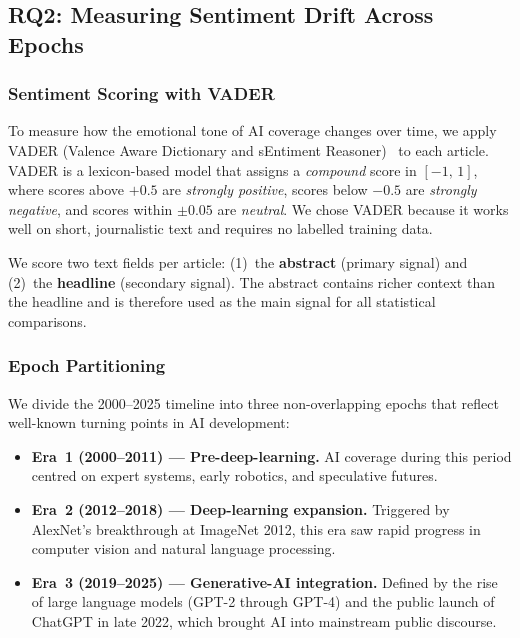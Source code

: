 
\subsection{RQ2: Measuring Sentiment Drift Across Epochs}
\label{subsec:rq2-method}

\subsubsection{Sentiment Scoring with VADER}

To measure how the emotional tone of AI coverage changes over time, we apply
VADER (Valence Aware Dictionary and sEntiment Reasoner)~\cite{hutto2014vader}
to each article. VADER is a lexicon-based model that assigns a
\textit{compound} score in $[-1,\,1]$, where scores above $+0.5$ are
\textit{strongly positive}, scores below $-0.5$ are \textit{strongly
negative}, and scores within $\pm 0.05$ are \textit{neutral}. We chose VADER
because it works well on short, journalistic text and requires no
labelled training data.

We score two text fields per article: (1)~the \textbf{abstract} (primary
signal) and (2)~the \textbf{headline} (secondary signal). The abstract
contains richer context than the headline and is therefore used as the main
signal for all statistical comparisons.

\subsubsection{Epoch Partitioning}

We divide the 2000--2025 timeline into three non-overlapping epochs that
reflect well-known turning points in AI development:

\begin{itemize}
  \item \textbf{Era~1 (2000--2011) --- Pre-deep-learning.} AI coverage
  during this period centred on expert systems, early robotics, and
  speculative futures.
  \item \textbf{Era~2 (2012--2018) --- Deep-learning expansion.} Triggered
  by AlexNet's breakthrough at ImageNet 2012, this era saw rapid progress in
  computer vision and natural language processing.
  \item \textbf{Era~3 (2019--2025) --- Generative-AI integration.} Defined
  by the rise of large language models (GPT-2 through GPT-4) and the public
  launch of ChatGPT in late 2022, which brought AI into mainstream public
  discourse.
\end{itemize}

